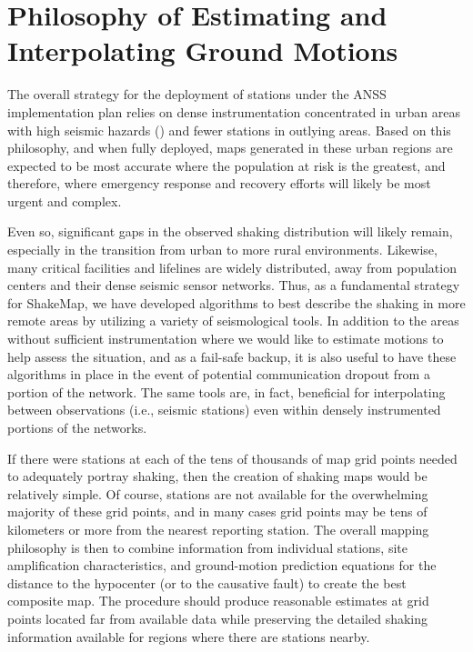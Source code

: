 \documentclass[letterpaper,10pt,english]{sphinxmanual}
\begin{document}
\section{Philosophy of Estimating and Interpolating Ground Motions}
\label{tg_philosophy::doc}\label{tg_philosophy:sec-philosophy}\label{tg_philosophy:philosophy-of-estimating-and-interpolating-ground-motions}
The overall strategy for the deployment of stations under the ANSS implementation plan
relies on dense instrumentation concentrated in urban areas with high seismic hazards
({\hyperref[references:usgs1999]{}}) and fewer stations in outlying areas.  Based on this philosophy, and when
fully deployed, maps generated in these urban regions are expected to be most accurate
where the population at risk is the greatest, and therefore, where emergency response and
recovery efforts will likely be most urgent and complex.

Even so, significant gaps in the observed shaking distribution will likely remain,
especially in the transition from urban to more rural environments. Likewise, many
critical facilities and lifelines are widely distributed, away from population centers and
their dense seismic sensor networks.  Thus, as a fundamental strategy for ShakeMap, we
have developed algorithms to best describe the shaking in more remote areas by utilizing
a variety of seismological tools.  In addition to the areas without sufficient
instrumentation where we would like to estimate motions to help assess the situation, and
as a fail-safe backup, it is also useful to have these algorithms in place in
the event of potential communication dropout from a portion of the network.  The same
tools are, in fact, beneficial for interpolating between observations (i.e., seismic stations) even
within densely instrumented portions of the networks.

If there were stations at each of the tens of thousands of map grid points needed to
adequately portray shaking, then the creation of shaking maps would be relatively simple.
Of course, stations are not available for the overwhelming majority of these grid points, and in many cases grid
points may be tens of kilometers or more from the nearest reporting station.  The overall mapping
philosophy is then to combine information from individual stations, site amplification
characteristics, and ground-motion prediction equations for the distance to the hypocenter
(or to the causative fault) to create the best composite map.  The procedure should
produce reasonable estimates at grid points located far from available data while
preserving the detailed shaking information available for regions where there are stations
nearby.
\end{document}
